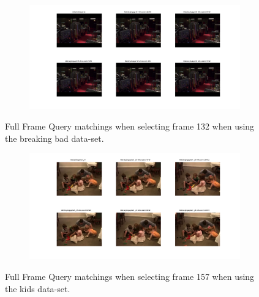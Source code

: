 \documentclass{paper}
\begin{document}
\begin{figure}[H]
\centering
\begin{subfigure}{1.0\textwidth}
\includegraphics[width=\textwidth]{figures/full_frame_queries/bb/fullQueries132}
\end{subfigure}
\caption{Full Frame Query matchings when selecting frame 132 when using the breaking bad data-set.}
\label{fig:bb_fullquery_2}
\end{figure}

\begin{figure}[H]
\centering
\begin{subfigure}{1.0\textwidth}
\includegraphics[width=\textwidth]{figures/full_frame_queries/kids/fullQueries157}
\end{subfigure}
\caption{Full Frame Query matchings when selecting frame 157 when using the kids data-set.}
\label{fig:kids_fullquery_1}
\end{figure}
\end{document}
